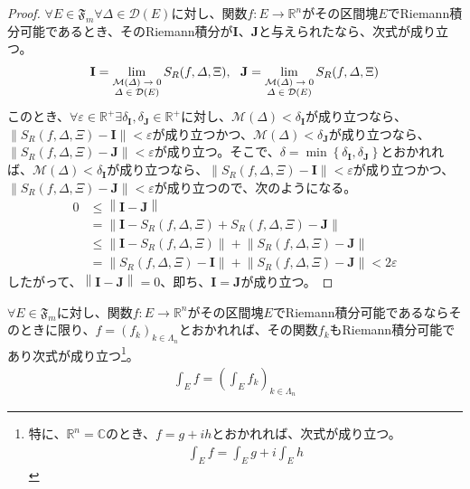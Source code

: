 \documentclass[dvipdfmx]{jsarticle}
\begin{document}
\begin{proof}
$\forall E \in \mathfrak{F}_{m}\forall\varDelta \in \mathcal{D}(E)$に対し、関数$f:E \rightarrow \mathbb{R}^{n}$がその区間塊$E$でRiemann積分可能であるとき、そのRiemann積分が$\mathbf{I}$、$\mathbf{J}$と与えられたなら、次式が成り立つ。
\begin{align*}
\mathbf{I} = \lim_{\scriptsize \begin{matrix}
\mathcal{M}(\varDelta) \rightarrow 0 \\
\varDelta \in \mathcal{D}(E) \\
\end{matrix}}{S_{R}(f,\varDelta,\Xi)},\ \ \mathbf{J} = \lim_{\scriptsize \begin{matrix}
\mathcal{M}(\varDelta) \rightarrow 0 \\
\varDelta \in \mathcal{D}(E) \\
\end{matrix}}{S_{R}(f,\varDelta,\Xi)}
\end{align*}
このとき、$\forall\varepsilon \in \mathbb{R}^{+}\exists\delta_{\mathbf{I}},\delta_{\mathbf{J}} \in \mathbb{R}^{+}$に対し、$\mathcal{M}(\varDelta) < \delta_{\mathbf{I}}$が成り立つなら、$\left\| S_{R}(f,\varDelta,\Xi) - \mathbf{I} \right\| < \varepsilon$が成り立つかつ、$\mathcal{M}(\varDelta) < \delta_{\mathbf{J}}$が成り立つなら、$\left\| S_{R}(f,\varDelta,\Xi) - \mathbf{J} \right\| < \varepsilon$が成り立つ。そこで、$\delta = \min\left\{ \delta_{\mathbf{I}},\delta_{\mathbf{J}} \right\}$とおかれれば、$\mathcal{M}(\varDelta) < \delta_{\mathbf{I}}$が成り立つなら、$\left\| S_{R}(f,\varDelta,\Xi) - \mathbf{I} \right\| < \varepsilon$が成り立つかつ、$\left\| S_{R}(f,\varDelta,\Xi) - \mathbf{J} \right\| < \varepsilon$が成り立つので、次のようになる。
\begin{align*}
0 &\leq \left\| \mathbf{I} - \mathbf{J} \right\|\\
&= \left\| \mathbf{I} - S_{R}(f,\varDelta,\Xi) + S_{R}(f,\varDelta,\Xi) - \mathbf{J} \right\|\\
&\leq \left\| \mathbf{I} - S_{R}(f,\varDelta,\Xi) \right\| + \left\| S_{R}(f,\varDelta,\Xi) - \mathbf{J} \right\|\\
&= \left\| S_{R}(f,\varDelta,\Xi) - \mathbf{I} \right\| + \left\| S_{R}(f,\varDelta,\Xi) - \mathbf{J} \right\| < 2\varepsilon
\end{align*}
したがって、$\left\| \mathbf{I} - \mathbf{J} \right\| = 0$、即ち、$\mathbf{I} = \mathbf{J}$が成り立つ。
\end{proof}
\begin{thm}\label{4.6.5.7}
$\forall E \in \mathfrak{F}_{m}$に対し、関数$f:E \rightarrow \mathbb{R}^{n}$がその区間塊$E$でRiemann積分可能であるならそのときに限り、$f = \left( f_{k} \right)_{k \in \varLambda_{n}}$とおかれれば、その関数$f_{k}$もRiemann積分可能であり次式が成り立つ\footnote{特に、$\mathbb{R}^{n} = \mathbb{C}$のとき、$f = g + ih$とおかれれば、次式が成り立つ。
\begin{align*}
\int_{E} f = \int_{E} g + i\int_{E} h
\end{align*}}。
\begin{align*}
\int_{E} f = \left( \int_{E} f_{k} \right)_{k \in \varLambda_{n}}
\end{align*}
\end{thm}
\end{document}
